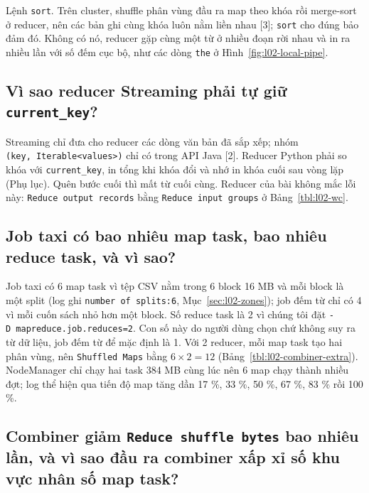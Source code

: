 \documentclass[
  12pt,
  a4paper,
]{report}
\begin{document}
Lệnh \texttt{sort}. Trên cluster, shuffle phân vùng đầu ra map theo khóa
rồi merge-sort ở reducer, nên các bản ghi cùng khóa luôn nằm liền nhau
{[}3{]}; \texttt{sort} cho đúng bảo đảm đó. Không có nó, reducer gặp
cùng một từ ở nhiều đoạn rời nhau và in ra nhiều lần với số đếm cục bộ,
như các dòng \texttt{the} ở Hình~\ref{fig:l02-local-pipe}.

\subsection{\texorpdfstring{Vì sao reducer Streaming phải tự giữ
\texttt{current\_key}?}{Vì sao reducer Streaming phải tự giữ current\_key?}}\label{sec:l02-q2}

Streaming chỉ đưa cho reducer các dòng văn bản đã sắp xếp; nhóm
\texttt{(key,}\allowbreak{}\texttt{\ Iterable\textless{}values\textgreater{})}\allowbreak{}
chỉ có trong API Java {[}2{]}. Reducer Python phải so khóa với
\texttt{current\_key}, in tổng khi khóa đổi và nhớ in khóa cuối sau vòng
lặp (Phụ lục). Quên bước cuối thì mất từ cuối cùng. Reducer của bài
không mắc lỗi này: \texttt{Reduce\ output\ records}\allowbreak{} bằng
\texttt{Reduce\ input\ groups}\allowbreak{} ở Bảng~\ref{tbl:l02-wc}.

\subsection{Job taxi có bao nhiêu map task, bao nhiêu reduce task, và vì
sao?}\label{sec:l02-q3}

Job taxi có 6 map task vì tệp CSV nằm trong 6 block 16 MB và mỗi block
là một split (log ghi
\texttt{number\ of\ splits:}\allowbreak{}\texttt{6}\allowbreak{},
Mục~\ref{sec:l02-zones}); job đếm từ chỉ có 4 vì mỗi cuốn sách nhỏ hơn
một block. Số reduce task là 2 vì chúng tôi đặt
\texttt{-D\ mapreduce.}\allowbreak{}\texttt{job.}\allowbreak{}\texttt{reduces=}\allowbreak{}\texttt{2}\allowbreak{}.
Con số này do người dùng chọn chứ không suy ra từ dữ liệu, job đếm từ để
mặc định là 1. Với 2 reducer, mỗi map task tạo hai phân vùng, nên
\texttt{Shuffled\ Maps} bằng \(6 \times 2 = 12\)
(Bảng~\ref{tbl:l02-combiner-extra}). NodeManager chỉ chạy hai task 384
MB cùng lúc nên 6 map chạy thành nhiều đợt; log thể hiện qua tiến độ map
tăng dần 17 \%, 33 \%, 50 \%, 67 \%, 83 \% rồi 100 \%.

\subsection{\texorpdfstring{Combiner giảm
\texttt{Reduce\ shuffle\ bytes}\allowbreak{} bao nhiêu lần, và vì sao
đầu ra combiner xấp xỉ số khu vực nhân số map
task?}{Combiner giảm Reduce shuffle bytes bao nhiêu lần, và vì sao đầu ra combiner xấp xỉ số khu vực nhân số map task?}}\label{sec:l02-q4}
\end{document}
